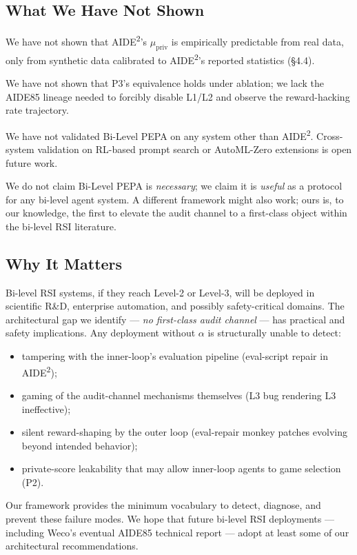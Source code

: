 \subsection{What We Have Not Shown}

We have not shown that AIDE\textsuperscript{2}'s $\mu_{\text{priv}}$ is empirically predictable from real data, only from synthetic data calibrated to AIDE\textsuperscript{2}'s reported statistics (\S4.4).

We have not shown that P3's equivalence holds under ablation; we lack the AIDE85 lineage needed to forcibly disable L1/L2 and observe the reward-hacking rate trajectory.

We have not validated Bi-Level PEPA on any system other than AIDE\textsuperscript{2}. Cross-system validation on RL-based prompt search or AutoML-Zero extensions is open future work.

We do not claim Bi-Level PEPA is \emph{necessary}; we claim it is \emph{useful} as a protocol for any bi-level agent system. A different framework might also work; ours is, to our knowledge, the first to elevate the audit channel to a first-class object within the bi-level RSI literature.

\subsection{Why It Matters}

Bi-level RSI systems, if they reach Level-2 or Level-3, will be deployed in scientific R\&D, enterprise automation, and possibly safety-critical domains. The architectural gap we identify --- \emph{no first-class audit channel} --- has practical and safety implications. Any deployment without $\alpha$ is structurally unable to detect:
\begin{itemize}
    \item tampering with the inner-loop's evaluation pipeline (eval-script repair in AIDE\textsuperscript{2});
    \item gaming of the audit-channel mechanisms themselves (L3 bug rendering L3 ineffective);
    \item silent reward-shaping by the outer loop (eval-repair monkey patches evolving beyond intended behavior);
    \item private-score leakability that may allow inner-loop agents to game selection (P2).
\end{itemize}

Our framework provides the minimum vocabulary to detect, diagnose, and prevent these failure modes. We hope that future bi-level RSI deployments --- including Weco's eventual AIDE85 technical report --- adopt at least some of our architectural recommendations.


